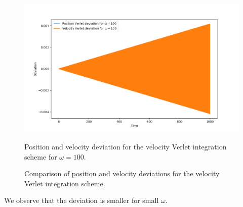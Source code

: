 \begin{figure}[h!]
    \vspace{1em}
    \begin{minipage}{0.45\textwidth}
        \centering
        \includegraphics[width=\textwidth]{FIG/ex9/stability_comparison_2.png}
        \caption{Position and velocity deviation for the velocity Verlet integration scheme for $\omega=100$.}
        \label{fig:stability_comparison_2}
    \end{minipage}
    
    \caption{Comparison of position and velocity deviations for the velocity Verlet integration scheme.}
    \label{fig:stability_comparison}
\end{figure}

We observe that the deviation is smaller for small $\omega$.
